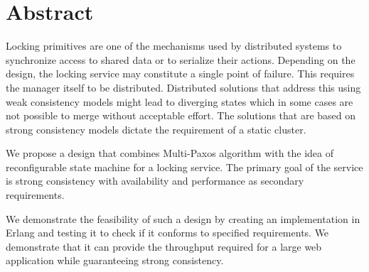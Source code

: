 \chapter{Abstract}

Locking primitives are one of the mechanisms used by distributed systems
to synchronize access to shared data or to serialize their actions. Depending
on the design, the locking service may constitute
a single point of failure. This requires the manager itself to be
distributed. Distributed solutions that address this using weak consistency 
models might lead to diverging states which in some cases are not possible to
merge without acceptable effort. The solutions that are based on strong
consistency models dictate the requirement of a static cluster.

We propose a design that combines Multi-Paxos algorithm with the idea of
reconfigurable state machine for a locking service. The primary goal of
the service is strong consistency with availability and performance as
secondary requirements.

We demonstrate the feasibility of such a design by creating an implementation
in Erlang and testing it to check if it conforms to specified requirements.
We demonstrate that it can provide the throughput required for a large
web application while guaranteeing strong consistency.
